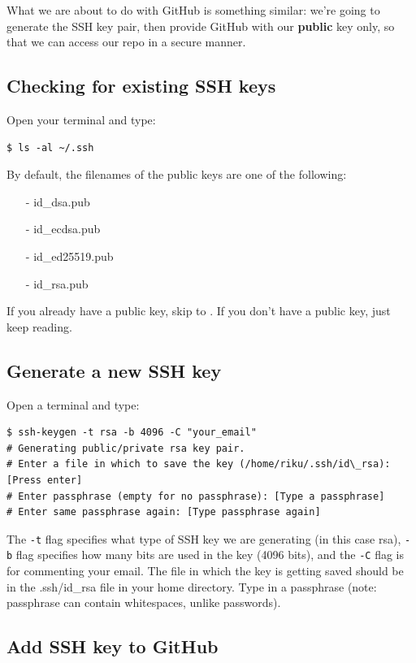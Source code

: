 \documentclass[a4paper, 12pt]{article}
\begin{document}
What we are about to do with GitHub is something similar: we're going to generate the SSH key pair, then provide GitHub with our {\bfseries public} key only, so that we can access our repo in a secure manner.

\subsection*{Checking for existing SSH keys}

Open your terminal and type:
\begin{lstlisting}
$ ls -al ~/.ssh
\end{lstlisting}
By default, the filenames of the public keys are one of the following:
\begin{itemize}
\item[-] id\_dsa.pub
\item[-] id\_ecdsa.pub
\item[-] id\_ed25519.pub
\item[-] id\_rsa.pub
\end{itemize}

If you already have a public key, skip to {\itshape {}}.
If you don't have a public key, just keep reading.

\subsection*{Generate a new SSH key}

Open a terminal and type:
\begin{lstlisting}
$ ssh-keygen -t rsa -b 4096 -C "your_email"
# Generating public/private rsa key pair.
# Enter a file in which to save the key (/home/riku/.ssh/id\_rsa): 
[Press enter]
# Enter passphrase (empty for no passphrase): [Type a passphrase]
# Enter same passphrase again: [Type passphrase again]
\end{lstlisting}
The \verb|-t| flag specifies what type of SSH key we are generating (in this case rsa), \verb|-b| flag specifies how many bits are used in the key (4096 bits), and the \verb|-C| flag is for commenting your email.
The file in which the key is getting saved should be in the .ssh/id\_rsa file in your home directory.
Type in a passphrase (note: passphrase can contain whitespaces, unlike passwords).

\subsection*{Add SSH key to GitHub}
\label{sec:addssh}
\end{document}
